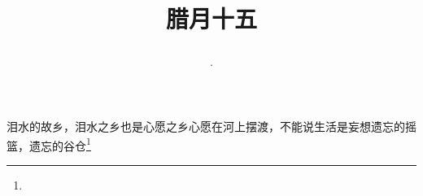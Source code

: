 \title{\date[d=25,m=1,y=2024][year:cn-y,年,month:cn,day:cn,日,·,weekday]·腊月十五 }
泪水的故乡，泪水之乡也是心愿之乡心愿在河上摆渡，不能说生活是妄想遗忘的摇篮，遗忘的谷仓\footnote{ }

